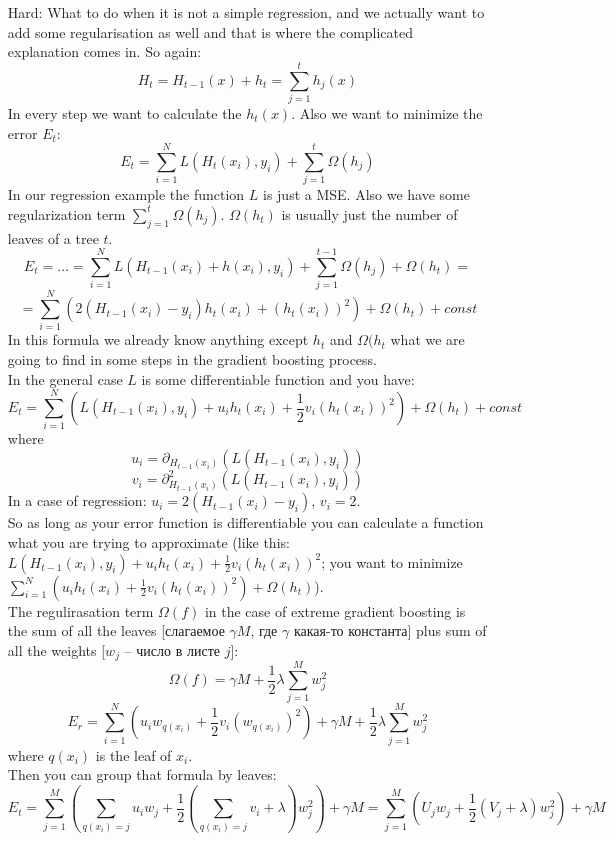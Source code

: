 \begin{enumerate}
  {\it <Some talk about libraries. I'm not enough motivated to recognize that speech.>}
  \item[Hard:] What to do when it is not a simple regression, and we actually want to add some regularisation as well and that is where the complicated explanation comes in. So again:
  $$H_t=H_{t-1}(x)+h_t=\sum\limits_{j=1}^t h_j(x)$$
  In every step we want to calculate the $h_t(x)$. Also we want to minimize the error $E_t$:
  $$E_t=\sum\limits_{i=1}^{N}L(H_t(x_i),y_i) + \sum\limits_{j=1}^t \Omega(h_j)$$
  In our regression example the function $L$ is just a MSE. Also we have some regularization term $\sum_{j=1}^t \Omega(h_j)$. $\Omega(h_t)$ is usually just the number of leaves of a tree $t$.
  $$E_t=\ldots=\sum\limits_{i=1}^{N}L(H_{t-1}(x_i) + h(x_i),y_i) + \sum\limits_{j=1}^{t-1} \Omega(h_j)+\Omega(h_t)=$$
  $$=\sum\limits_{i=1}^N\left(2(H_{t-1}(x_i)-y_i)h_t(x_i)+(h_t(x_i))^2\right)+\Omega(h_t)+const$$
  In this formula we already know anything except $h_t$ and $\Omega(h_t$ what we are going to find in some steps in the gradient boosting process.\\
  In the general case $L$ is some differentiable function and you have:
  $$E_t=\sum\limits_{i=1}^N\left(L(H_{t-1}(x_i), y_i)+u_ih_t(x_i)+\frac{1}{2}v_i(h_t(x_i))^2\right)+\Omega(h_t)+const$$
  where
  $$u_i=\partial_{H_{t-1}(x_i)}\left(L(H_{t-1}(x_i), y_i)\right)$$
  $$v_i=\partial_{H_{t-1}(x_i)}^2\left(L(H_{t-1}(x_i), y_i)\right)$$
  In a case of regression: $u_i=2(H_{t-1}(x_i)-y_i)$, $v_i=2$. \\
  So as long as your error function is differentiable you can calculate a function what you are trying to approximate (like this: $L(H_{t-1}(x_i), y_i)+u_ih_t(x_i)+\frac{1}{2}v_i(h_t(x_i))^2$; you want to minimize $\sum_{i=1}^N \left(u_ih_t(x_i)+\frac{1}{2}v_i(h_t(x_i))^2\right) + \Omega(h_t)$).\\
  The regulirasation term $\Omega(f)$ in the case of extreme gradient boosting is the sum of all the leaves [слагаемое $\gamma M$, где $\gamma$ какая-то константа] plus sum of all the weights [$w_j$ -- число в листе $j$]:
  $$\Omega(f)=\gamma M+\frac{1}{2}\lambda\sum\limits_{j=1}^{M}w_j^2$$
  $$E_r=\sum\limits_{i=1}^{N}\left(u_iw_{q(x_i)}+\frac{1}{2}v_i(w_{q(x_i)})^2\right)+\gamma M + \frac{1}{2}\lambda\sum\limits_{j=1}^{M}w_j^2$$
  where $q(x_i)$ is the leaf of $x_i$.\\
  Then you can group that formula by leaves:
  $$E_t=\sum\limits_{j=1}^{M}\left(\sum\limits_{q(x_i)=j}u_iw_j+\frac{1}{2}\left(\sum\limits_{q(x_i)=j}v_i+\lambda\right)w_j^2\right)+\gamma M=\sum\limits_{j=1}^M\left(U_jw_j+\frac{1}{2}(V_j+\lambda)w_j^2\right)+\gamma M$$

\end{enumerate}
